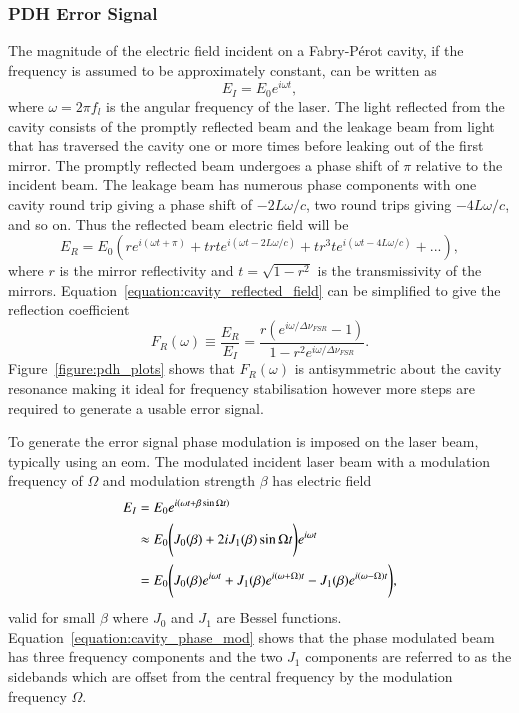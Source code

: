 \subsubsection{PDH Error Signal}\label{section:pdh_error}

The magnitude of the electric field incident on a Fabry-P\'erot cavity, if the frequency is assumed to be approximately constant, can be written as
\begin{equation}
E_{I} = E_0 e^{i\omega t},
\end{equation}
where $\omega=2\pi f_l$ is the angular frequency of the laser.
The light reflected from the cavity consists of the promptly reflected beam and the leakage beam from light that has traversed the cavity one or more times before leaking out of the first mirror.
The promptly reflected beam undergoes a phase shift of $\pi$ relative to the incident beam.
The leakage beam has numerous phase components with one cavity round trip giving a phase shift of $-2L\omega/c$, two round trips giving $-4L\omega/c$, and so on.
Thus the reflected beam electric field will be
\begin{equation}\label{equation:cavity_reflected_field}
E_R = E_0 \left( r e^{i\left(\omega t + \pi\right)} + t r t e^{i\left(\omega t -2L\omega/c\right)} + t r^3 t e^{i\left(\omega t -4L\omega/c\right)} + ...\right),
\end{equation}
where $r$ is the mirror reflectivity and $t=\sqrt{1-r^2}$ is the transmissivity of the mirrors.
Equation~\ref{equation:cavity_reflected_field} can be simplified to give the reflection coefficient
\begin{equation}\label{equation:reflection_coefficient}
F_R(\omega) \equiv \frac{E_R}{E_I} = \frac{r\left(e^{i\omega / \Delta\nu_{FSR}} - 1 \right)}{1-r^2 e^{i\omega / \Delta\nu_{FSR}}}.
\end{equation}
Figure~\ref{figure:pdh_plots} shows that $F_R(\omega)$ is antisymmetric about the cavity resonance making it ideal for frequency stabilisation however more steps are required to generate a usable error signal.

To generate the error signal phase modulation is imposed on the laser beam, typically using an \gls{eom}.
The modulated incident laser beam with a modulation frequency of $\Omega$ and modulation strength $\beta$ has electric field
\begin{align}
E_I &= E_0 e^{i\left(\omega t + \beta \sin\Omega t \right)} \notag \\
&\approx E_0 \Bigg( J_0(\beta) + 2iJ_1(\beta)\sin\Omega t \Bigg)e^{i\omega t} \notag \\
&= E_0 \Bigg( J_0(\beta)e^{i\omega t} + J_1(\beta)e^{i(\omega + \Omega)t} - J_1(\beta)e^{i(\omega - \Omega)t} \Bigg),\label{equation:cavity_phase_mod}
\end{align}
valid for small $\beta$ where $J_0$ and $J_1$ are Bessel functions.
Equation~\ref{equation:cavity_phase_mod} shows that the phase modulated beam has three frequency components and the two $J_1$ components are referred to as the sidebands which are offset from the central frequency by the modulation frequency $\Omega$.

